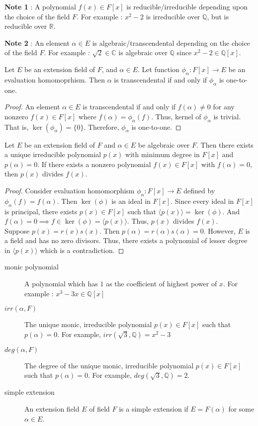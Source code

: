 \textbf{Note 1} : A polynomial $f(x) \in F[x]$ is reducible/irreducible depending upon the choice of the field $F$. For example : $x^2-2$ is irreducible over $\mathbb{Q}$, but is reducible over $\mathbb{R}$.

\textbf{Note 2} : An element $\alpha \in E$ is algebraic/transcendental depending on the choice of the field $F$. For example : $\sqrt{2} \in \mathbb{C}$ is algebraic over $\mathbb{Q}$ since $x^2-2 \in \mathbb{Q}[x]$.

\begin{theorem}
	Let $E$ be an extension field of $F$, and $\alpha \in E$. Let function $\phi_\alpha : F[x] \to E$ be an evaluation homomoprhism. Then $\alpha$ is transcendental  if and only if $\phi_\alpha$ is one-to-one.
\end{theorem}
\begin{proof}
	An element $\alpha \in E$ is transcendental if and only if $f(\alpha) \ne 0$ for any nonzero $f(x) \in F[x]$ where $f(\alpha) = \phi_\alpha(f)$. Thus, kernel of $\phi_\alpha$ is trivial. That is, $\ker(\phi_\alpha) = \{ 0 \}$. Therefore, $\phi_\alpha$ is one-to-one.
\end{proof}

\begin{theorem}
	Let $E$ be an extension field of $F$ and $\alpha \in E$ be algebraic over $F$. Then there exists a unique irreducible polynomial $p(x)$ with minimum degree in $F[x]$ and $p(\alpha) = 0$. If there exists a nonzero polynomial $f(x) \in F[x]$ with $f(\alpha) = 0$, then $p(x)$ divides $f(x)$.
\end{theorem}
\begin{proof}
	Consider evaluation homomorphism $\phi_\alpha : F[x] \to E$ defined by $\phi_\alpha(f) = f(\alpha)$. Then $\ker(\phi)$ is an ideal in $F[x]$. Since every ideal in $F[x]$ is principal, there exists $p(x) \in F[x]$ such that $\langle p(x) \rangle = \ker(\phi)$. And $f(\alpha) = 0 \implies f \in \ker(\phi) = \langle p(x) \rangle$. Thus, $p(x)$ divides $f(x)$.\\

	Suppose $p(x) = r(x)s(x)$. Then $p(\alpha) = r(\alpha)s(\alpha) = 0$. However, $E$ is a field and has no zero divisors. Thus, there exists a polynomial of lesser degree in $\langle p(x) \rangle$ which is a contradiction.
\end{proof}

\begin{description}
	\item[monic polynomial] A polynomial which has $1$ as the coefficient of highest power of $x$. For example : $x^3 - 3x \in \mathbb{Q}[x]$
	\item[$irr(\alpha,F)$] The unique monic, irreducible polynomial $p(x) \in F[x]$ such that $p(\alpha) = 0$. For example, $irr(\sqrt{3},\mathbb{Q}) = x^2-3$
	\item[$deg(\alpha,F)$] The degree of the unique monic, irreducible polynomial $p(x) \in F[x]$ such that $p(\alpha) = 0$. For example, $deg(\sqrt{3},\mathbb{Q}) = 2$.
	\item[simple extension] An extension field $E$ of field $F$ is a simple extension if $E = F(\alpha)$ for some $\alpha \in E$.
\end{description}

